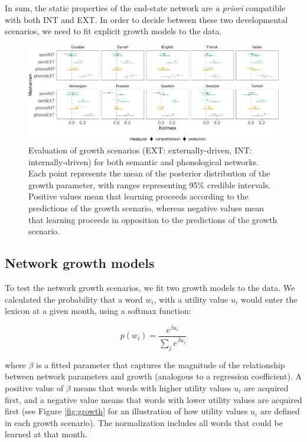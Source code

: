 \documentclass[english,floatsintext,man]{apa6}
\theoremstyle{definition}
\theoremstyle{definition}
\theoremstyle{definition}
\theoremstyle{remark}
\begin{document}
In sum, the static properties of the end-state network are \emph{a
priori} compatible with both INT and EXT. In order to decide between
these two developmental scenarios, we need to fit explicit growth models
to the data.

\begin{figure}[!h]
\includegraphics[width=\textwidth]{ms_files/figure-latex/growthPred-1} \caption{Evaluation of growth scenarios (EXT: externally-driven, INT: internally-driven) for both semantic and phonological networks. Each point represents the mean of the posterior distribution of the growth parameter, with ranges representing 95\% credible intervals. Positive values mean that learning proceeds according to the predictions of the growth scenario, whereas negative values mean that learning proceeds in opposition to the predictions of the growth scenario.}\label{fig:growthPred}
\end{figure}

\subsection{Network growth models}\label{network-growth-models}

To test the network growth scenarios, we fit two growth models to the
data. We calculated the probability that a word \(w_i\), with a utility
value \(u_i\) would enter the lexicon at a given month, using a softmax
function:

\begin{equation}
 p(w_i)= \frac{e^{\beta u_i}}{\sum_j e^{\beta u_j} }
\end{equation}

\noindent where \(\beta\) is a fitted parameter that captures the
magnitude of the relationship between network parameters and growth
(analogous to a regression coefficient). A positive value of \(\beta\)
means that words with higher utility values \(u_i\) are acquired first,
and a negative value means that words with lower utility values are
acquired first (see Figure \ref{fig:growth} for an illustration of how
utility values \(u_i\) are defined in each growth scenario). The
normalization includes all words that could be learned at that month.
\end{document}

